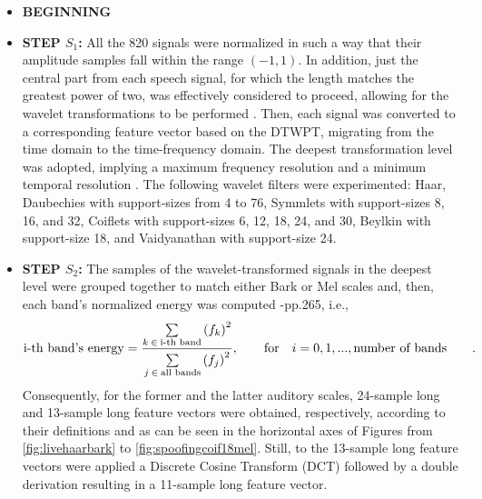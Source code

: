 \begin{itemize}
\item{}\textbf{BEGINNING}
\item{}\textbf{STEP $S_1$: }All the 820 signals were normalized in such a way that their amplitude samples fall within the range $(-1,1)$. In addition, just the central part from each speech signal, for which the length matches the greatest power of two, was effectively considered to proceed, allowing for the wavelet transformations to be performed \cite{guidodwt1}. Then, each signal was converted to a corresponding feature vector based on the DTWPT, migrating from the time domain to the time-frequency domain. The deepest transformation level was adopted, implying a maximum frequency resolution and a minimum temporal resolution \cite{guidodwt1}. The following wavelet filters were experimented: Haar, Daubechies with support-sizes from 4 to 76, Symmlets with support-sizes 8, 16, and 32, Coiflets with support-sizes 6, 12, 18, 24, and 30, Beylkin with support-size 18, and Vaidyanathan with support-size 24. 

\item{}\textbf{STEP $S_2$: }The samples of the wavelet-transformed signals in the deepest level were grouped together to match either Bark \cite{bossi} or Mel scales \cite{bossi2} and, then, each band's normalized energy was computed \cite{tut_se}-pp.265, i.e., $$\text{i-th band's energy}=\frac{\sum\limits_{k \hspace*{+2pt} \in \hspace*{+2pt} \text{i-th band}}{{(f_k)}^{2}}}{\sum\limits_{j \hspace*{+2pt} \in \hspace*{+2pt} \text{all bands}}^{}{(f_j)}^{2}}, \qquad \text{for} \quad i=0, 1, ..., \text{number of bands}\qquad .$$ Consequently, for the former and the latter auditory scales, 24-sample long and 13-sample long feature vectors were obtained, respectively, according to their definitions \cite{bossi2} and as can be seen in the horizontal axes of Figures from \ref{fig:livehaarbark} to \ref{fig:spoofingcoif18mel}. Still, to the 13-sample long feature vectors were applied a Discrete Cosine Transform (DCT) followed by a double derivation resulting in a 11-sample long feature vector.


\end{itemize}

